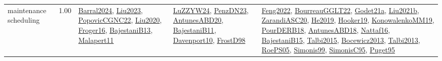 {\begin{longtable}{p{3cm}r>{\raggedright\arraybackslash}p{6cm}>{\raggedright\arraybackslash}p{6cm}>{\raggedright\arraybackslash}p{8cm}}
\index{maintenance scheduling}\index{ApplicationAreas!maintenance scheduling}maintenance scheduling &  1.00 & \hyperref[detail:Barral2024]{Barral2024}, \hyperref[detail:Liu2023]{Liu2023}, \hyperref[detail:PopovicCGNC22]{PopovicCGNC22}, \hyperref[detail:Liu2020]{Liu2020}, \hyperref[detail:Froger16]{Froger16}, \hyperref[detail:BajestaniB13]{BajestaniB13}, \hyperref[detail:Malapert11]{Malapert11} & \hyperref[detail:LuZZYW24]{LuZZYW24}, \hyperref[detail:PenzDN23]{PenzDN23}, \hyperref[detail:AntunesABD20]{AntunesABD20}, \hyperref[detail:BajestaniB11]{BajestaniB11}, \hyperref[detail:Davenport10]{Davenport10}, \hyperref[detail:FrostD98]{FrostD98} & \hyperref[detail:Feng2022]{Feng2022}, \hyperref[detail:BourreauGGLT22]{BourreauGGLT22}, \hyperref[detail:Godet21a]{Godet21a}, \hyperref[detail:Liu2021b]{Liu2021b}, \hyperref[detail:ZarandiASC20]{ZarandiASC20}, \hyperref[detail:He2019]{He2019}, \hyperref[detail:Hooker19]{Hooker19}, \hyperref[detail:KonowalenkoMM19]{KonowalenkoMM19}, \hyperref[detail:PourDERB18]{PourDERB18}, \hyperref[detail:AntunesABD18]{AntunesABD18}, \hyperref[detail:Nattaf16]{Nattaf16}, \hyperref[detail:BajestaniB15]{BajestaniB15}, \hyperref[detail:Talbi2015]{Talbi2015}, \hyperref[detail:Bocewicz2013]{Bocewicz2013}, \hyperref[detail:Talbi2013]{Talbi2013}, \hyperref[detail:RoePS05]{RoePS05}, \hyperref[detail:Simonis99]{Simonis99}, \hyperref[detail:SimonisC95]{SimonisC95}, \hyperref[detail:Puget95]{Puget95}\\

\end{longtable}}
